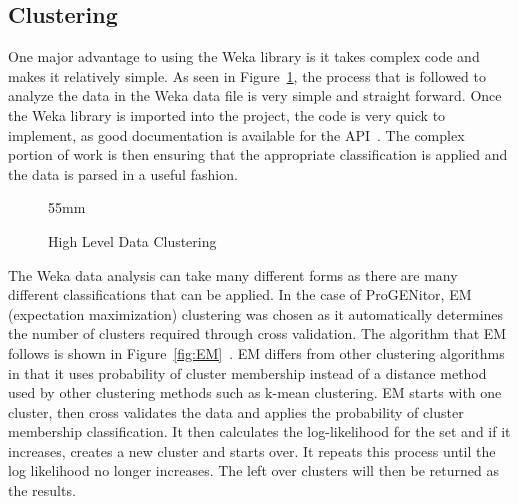 \subsection{Clustering}
One major advantage to using the Weka library is it takes complex code and makes
it relatively simple.  As seen in Figure~\ref{fig:clustering}, the process that
is followed to analyze the data in the Weka data file is very simple and straight
forward.  Once the Weka library is imported into the project, the code is very
quick to implement, as good documentation is available for the API~\cite{weka}. 
The complex portion of work is then ensuring that the appropriate classification is
applied and the data is parsed in a useful fashion.


\usetikzlibrary{shapes,arrows,chains}

\begin{figure}[H]
	\centering
	\resizebox {!} {55mm} {
}
	\caption{High Level Data Clustering}
	\label{fig:clustering}
\end{figure}

The Weka data analysis can take many different forms as there are many different
classifications that can be applied.  In the case of ProGENitor, EM (expectation
maximization) clustering was chosen as it automatically determines the number of
clusters required through cross validation.  The algorithm that EM follows is
shown in Figure~\ref{fig:EM}~\cite{EM}.  EM differs from other clustering
algorithms in that it uses probability of cluster membership instead of a
distance method used by other clustering methods such as k-mean clustering.  EM
starts with one cluster, then cross validates the data and applies the
probability of cluster membership classification.  It then calculates the
log-likelihood for the set and if it increases, creates a new cluster and starts
over.  It repeats this process until the log likelihood no longer increases. 
The left over clusters will then be returned as the results.

